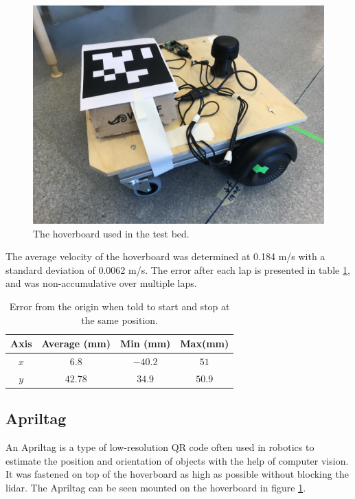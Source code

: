 \documentclass[nofilelist]{cslthse-msc}
\begin{document}
\begin{figure}[!hbt]
   \centering
   \includegraphics[scale=0.07]{images/hoverboard.jpg} 
   \caption{The hoverboard used in the test bed.}
   \label{fig:hoverboard}
\end{figure}

The average velocity of the hoverboard was determined at 0.184 m/s with a standard deviation of 0.0062 m/s. The error after each lap is presented in table \ref{tab:hoverboard-error}, and was non-accumulative over multiple laps. 

\begin{table}[!hbt]
   \centering
   \label{tab:hoverboard-error}
   \begin{tabular}{|c|c|c|c|}
      \hline
      \textbf{Axis} & \textbf{Average (mm)} & \textbf{Min (mm)} & \textbf{Max(mm)} \\
      \hline
      $x$ & $6.8 $ & $-40.2$ & $51$ \\
      \hline
      $y$ & $42.78$ & $34.9$ & $50.9$ \\
      \hline
   \end{tabular}
   \caption{Error from the origin when told to start and stop at the same position.}
\end{table}

\subsection{Apriltag}
An Apriltag is a type of low-resolution QR code often used in robotics to estimate the position and orientation of objects with the help of computer vision. It was fastened on top of the hoverboard as high as possible without blocking the lidar. The Apriltag can be seen mounted on the hoverboard in figure \ref{fig:hoverboard}.
\end{document}
